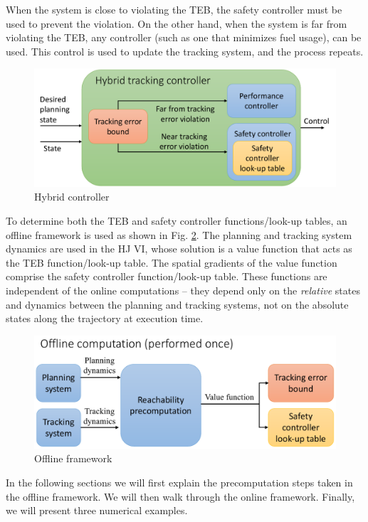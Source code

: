 When the system is close to violating the TEB, the safety controller must be used to prevent the violation. 
On the other hand, when the system is far from violating the TEB, any controller (such as one that minimizes fuel usage), can be used. 
This control is used to update the tracking system, and the process repeats.

\begin{figure}[h!]
  \centering
	\includegraphics[width=0.9\columnwidth]{fig/hybrid_controller}
	\caption{Hybrid controller}
	\label{fig:hybrid_ctrl}
\end{figure}

To determine both the TEB and safety controller functions/look-up tables, an offline framework is used as shown in Fig. \ref{fig:fw_offline}. 
The planning and tracking system dynamics are used in the HJ VI, whose solution is a value function that acts as the TEB function/look-up table. 
The spatial gradients of the value function comprise the safety controller function/look-up table. 
These functions are independent of the online computations -- they depend only on the \textit{relative} states and dynamics between the planning and tracking systems, not on the absolute states along the trajectory at execution time.

\begin{figure}[h!]
  \centering
	\includegraphics[width=0.9\columnwidth]{fig/framework_offline}
	\caption{Offline framework}
	\label{fig:fw_offline}
\end{figure}
In the following sections we will first explain the precomputation steps taken in the offline framework. 
We will then walk through the online framework.
Finally, we will present three numerical examples.

